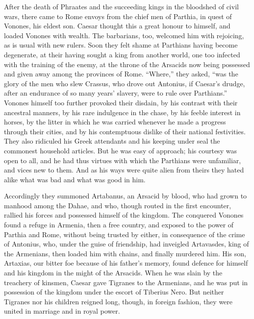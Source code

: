 After the death of Phraates and the succeeding kings in the bloodshed of civil wars, there came to Rome envoys from the chief men of Parthia, in quest of Vonones, his eldest son. Caesar thought this a great honour to himself, and loaded Vonones with wealth. The barbarians, too, welcomed him with rejoicing, as is usual with new rulers. Soon they felt shame at Parthians having become degenerate, at their having sought a king from another world, one too infected with the training of the enemy, at the throne of the Arsacids now being possessed and given away among the provinces of Rome. ``Where,'' they asked, ``was the glory of the men who slew Crassus, who drove out Antonius, if Caesar's drudge, after an endurance of so many years' slavery, were to rule over Parthians.'' Vonones himself too further provoked their disdain, by his contrast with their ancestral manners, by his rare indulgence in the chase, by his feeble interest in horses, by the litter in which he was carried whenever he made a progress through their cities, and by his contemptuous dislike of their national festivities. They also ridiculed his Greek attendants and his keeping under seal the commonest household articles. But he was easy of approach; his courtesy was open to all, and he had thus virtues with which the Parthians were unfamiliar, and vices new to them. And as his ways were quite alien from theirs they hated alike what was bad and what was good in him.


Accordingly they summoned Artabanus, an Arsacid by blood, who had grown to manhood among the Dahae, and who, though routed in the first encounter, rallied his forces and possessed himself of the kingdom. The conquered Vonones found a refuge in Armenia, then a free country, and exposed to the power of Parthia and Rome, without being trusted by either, in consequence of the crime of Antonius, who, under the guise of friendship, had inveigled Artavasdes, king of the Armenians, then loaded him with chains, and finally murdered him. His son, Artaxias, our bitter foe because of his father's memory, found defence for himself and his kingdom in the might of the Arsacids. When he was slain by the treachery of kinsmen, Caesar gave Tigranes to the Armenians, and he was put in possession of the kingdom under the escort of Tiberius Nero. But neither Tigranes nor his children reigned long, though, in foreign fashion, they were united in marriage and in royal power.


